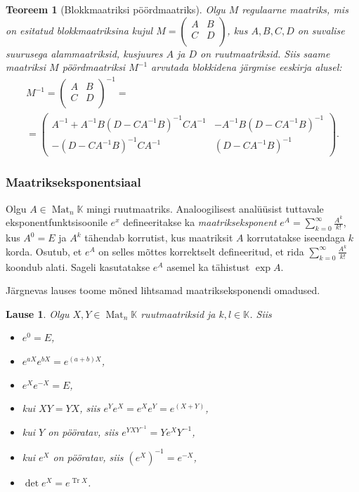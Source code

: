 \documentclass[12pt]{article}
\theoremstyle{plain}
\newtheorem{teoreem}{Teoreem}[section]
\newtheorem{lause}{Lause}[section]
\theoremstyle{definition}
\numberwithin{equation}{section}
\def\K{{\mathbb K}}
\DeclareMathOperator{\Mat}{Mat}
\DeclareMathOperator{\Tr}{Tr}
\begin{document}
\begin{teoreem}[Blokkmaatriksi pöördmaatriks]
Olgu $M$ regulaarne maatriks, mis on esitatud blokkmaatriksina kujul 
$M = \begin{pmatrix} A & B \\ C & D \\ \end{pmatrix}$, kus $A, B, C, D$ 
on suvalise suurusega alammaatriksid, kusjuures $A$ ja $D$ on 
ruutmaatriksid. Siis saame maatriksi $M$ pöördmaatriksi $M^{-1}$ 
arvutada blokkidena järgmise eeskirja alusel:
\begin{align*}
M^{-1} = \begin{pmatrix}
A & B \\ C & D \\
\end{pmatrix}^{-1} = \qquad\qquad\qquad\qquad\qquad \\
= \begin{pmatrix}
A^{-1}+A^{-1}B\left(D-CA^{-1}B\right)^{-1}CA^{-1} & 
	-A^{-1}B\left(D-CA^{-1}B\right)^{-1} \\
-\left(D- CA^{-1}B\right)^{-1}CA^{-1} & \left(D-CA^{-1}B\right)^{-1}
\end{pmatrix}.
\end{align*}
\end{teoreem}

\subsubsection*{Maatrikseksponentsiaal}

Olgu $A \in \Mat_n\K$ mingi ruutmaatriks. Analoogilisest analüüsist 
tuttavale eksponentfunktsisoonile $e^x$ defineeritakse ka 
\emph{maatrikseksponent} $e^A = \sum_{k = 0}^{\infty} \frac{A^k}{k!}$, 
kus $A^0 = E$ ja $A^k$ tähendab korrutist, kus maatriksit $A$ 
korrutatakse iseendaga $k$ korda. Osutub, et $e^A$ on selles mõttes 
korrektselt defineeritud, et rida 
$\sum_{k = 0}^{\infty} \frac{A^k}{k!}$ koondub alati. 
Sageli kasutatakse $e^A$ asemel ka tähistust $\exp A$.

Järgnevas lauses toome mõned lihtsamad maatrikseksponendi omadused.
\begin{lause}
Olgu $X, Y \in \Mat_n \K$ ruutmaatriksid ja $k, l \in \K$. Siis
\begin{itemize}
\item $e^0 = E$,
\item $e^{aX}e^{bX} = e^{\left(a+b\right)X}$,
\item $e^{X} e^{-X} = E$,
\item kui $XY = YX$, siis $e^Y e^X = e^X e^Y = e^{\left(X + Y\right)}$,
\item kui $Y$ on pööratav, siis $e^{YXY^{-1}} = Ye^XY^{-1}$,
\item kui $e^X$ on pööratav, siis $\left(e^X\right)^{-1} = e^{-X}$,
\item $\det e^X = e^{\Tr X}$.
\end{itemize}
\end{lause}
\end{document}

